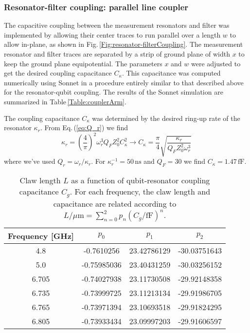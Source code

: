 \subsubsection{Resonator-filter coupling: parallel line coupler}

The capacitive coupling between the measurement resonators and filter was implemented by allowing their center traces to run parallel over a length $w$ to allow in-plane, as shown in Fig.\,\ref{Fig:resonator-filterCoupling}.
The measurement resonator and filter traces are separated by a strip of ground plane of width $x$ to keep the ground plane equipotential.
The parameters $x$ and $w$ were adjusted to get the desired coupling capacitance $C_{\kappa}$.
This capacitance was computed numerically using Sonnet in a procedure entirely similar to that described above for the resonator-qubit coupling.
The results of the Sonnet simulation are summarized in Table\,\ref{Table:couplerArm}.

The coupling capacitance $C_{\kappa}$ was determined by the desired ring-up rate of the resonator $\kappa_r$.
From Eq.\,(\ref{eq:Q_r}) we find \begin{equation}
\kappa_r = \left( \frac{4}{\pi} \right)^2 \omega_r^3 Q_F Z_0^2 C_{\kappa}^2 \longrightarrow C_{\kappa} = \frac{\pi}{4} \sqrt{\frac{\kappa_r}{Q_F Z_0^2 \omega_r^3}}\end{equation}
where we've used $Q_r = \omega_r / \kappa_r$. For $\kappa_r^{-1} = 50\,\text{ns}$ and $Q_F=30$ we find $C_{\kappa} = 1.47\,\text{fF}$.

\begin{table} \begin{center} \begin{tabular}{  c  c  c  c  }
\hline \hline
Frequency [GHz]	&	\quad	$p_0$	&	\quad $p_1$	&	\quad	$p_2$ \\
\hline
4.8 & -0.7610256 & 23.42786129 & -30.03751643 \\
5.0 & -0.75985036 & 23.40431259 & -30.03256152 \\
6.705 & -0.74027938 & 23.11730508 & -29.92148358 \\
6.735 & -0.73999725 & 23.11213134 & -29.91986705 \\
6.765 & -0.73971394 & 23.10693518 & -29.91824295 \\
6.805 & -0.73933434 & 23.09997203 & -29.91606597 \\
\hline \hline
\end{tabular}
\end{center}
\caption{Claw length $L$ as a function of qubit-resonator coupling capacitance $C_g$. For each frequency, the claw length and capacitance are related according to $L/\mu\text{m} = \sum_{n=0}^2 p_n (C_g/\text{fF})^n $.}
\label{Table:CgToL}
\end{table}

